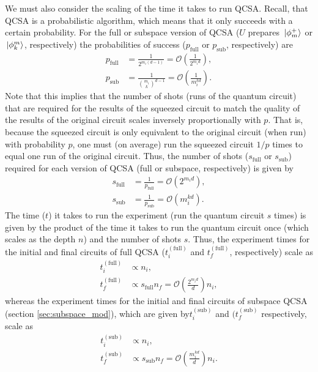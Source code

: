 \documentclass[10pt]{article}
\begin{document}
We must also consider the scaling of the time it takes to run QCSA. Recall, that QCSA is a probabilistic algorithm, which means that it only succeeds with a certain probability. For the full or subspace version of QCSA ($U$ prepares $\ket*{\phi^+_m}$ or $\ket*{\phi^m_k}$, respectively) the probabilities of success ($p_{\text{full}}$ or $p_{\text{sub}}$, respectively) are
\begin{align}
p_{\text{full}} 
&=
\frac{1}{2^{m_i(d-1)}}
=
\mathcal{O}\left(\frac{1}{2^{m_id}}\right),
\\
p_{\text{sub}} 
&=
\frac{1}{{m_i \choose k}^{d-1}} 
=
\mathcal{O}\left(\frac{1}{m_i^{kd}}\right).
\end{align}
Note that this implies that the number of shots (runs of the quantum circuit) that are required for the results of the squeezed circuit to match the quality of the results of the original circuit scales inversely proportionally with $p$. That is, because the squeezed circuit is only equivalent to the original circuit (when run) with probability $p$, one must (on average) run the squeezed circuit $1/p$ times to equal one run of the original circuit. Thus, the number of shots ($s_{\text{full}}$ or $s_{\text{sub}}$) required for each version of QCSA (full or subspace, respectively) is given by
\begin{align}
s_{\text{full}} 
&=
\frac{1}{p_{\text{full}}}
=
\mathcal{O}\left(2^{m_id}\right),
\\
s_{\text{sub}} 
&=
\frac{1}{p_{\text{sub}}} 
=
\mathcal{O}\left(m_i^{kd}\right).
\end{align}
The time ($t$) it takes to run the experiment (run the quantum circuit $s$ times) is given by the product of the time it takes to run the quantum circuit once (which scales as the depth $n$) and the number of shots $s$. Thus, the experiment times for the initial and final circuits of full QCSA ($t^{(\text{full})}_i$ and $t^{(\text{full})}_f$, respectively) scale as
\begin{align}
t^{(\text{full})}_i
&\propto
n_i,
\\
t^{(\text{full})}_f
&\propto
s_{\text{full}}n_f
=
\mathcal{O}\left(\frac{2^{m_id}}{d}\right)n_i,
\end{align}
whereas the experiment times for the initial and final circuits of subspace QCSA (section \ref{sec:subspace_mod}), which are given by$t^{(\text{sub})}_i$ and $(t^{(\text{sub})}_f$ respectively, scale as
\begin{align}
t^{(\text{sub})}_i
&\propto
n_i,
\\
t^{(\text{sub})}_f
&\propto
s_{\text{sub}}n_f
=
\mathcal{O}\left(\frac{m_i^{kd}}{d}\right)n_i.
\end{align}
\end{document}
